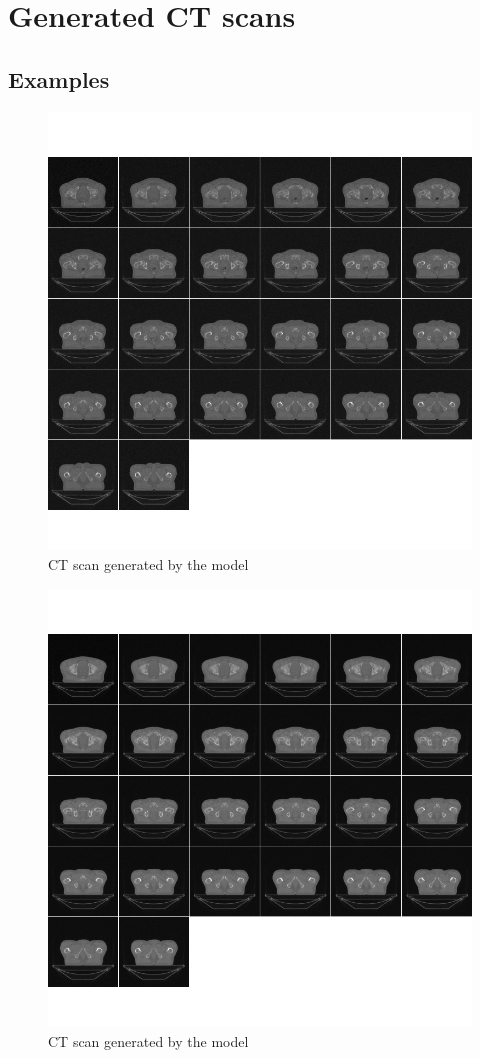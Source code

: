 \documentclass[11pt,a4paper]{report}
\begin{document}
\section{Generated CT scans}
\subsection{Examples}
\begin{figure}[H]
	\centering
	\includegraphics[scale=0.5]{images/generatedData1}
    \caption{CT scan generated by the model}
\end{figure}
\begin{figure}[H]
	\centering
	\includegraphics[scale=0.5]{images/generatedData2}
    \caption{CT scan generated by the model}
\end{figure}
\end{document}
